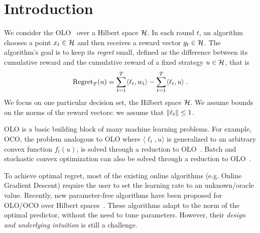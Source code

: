 \section{Introduction}
\label{section:introduction}

We consider the \ac{OLO}~\citep{Cesa-Bianchi-Lugosi-2006, Shalev-Shwartz-2011}
over a Hilbert space $\mathcal{H}$. In each round $t$, an algorithm chooses a point $x_t
\in \mathcal{H}$ and then receives a reward vector $g_t \in \mathcal{H}$. The algorithm's goal is
to keep its \emph{regret} small, defined as the difference between its
cumulative reward and the cumulative reward of a fixed strategy $u \in \mathcal{H}$,
that is
\[
\operatorname{Regret}_T(u) = \sum_{t=1}^T \langle \ell_t, w_t \rangle - \sum_{t=1}^T \langle \ell_t, u \rangle \; .
\]
We focus on one particular decision set, the Hilbert space
$\mathcal{H}$. 
We assume bounds on the norms of the reward vectors: we
assume that $\left\|{\ell_t}\right\| \le 1$.

\ac{OLO} is a basic building block of many machine learning problems. For
example, \ac{OCO}, the problem analogous to \ac{OLO} where $\langle \ell_t, u
\rangle$ is generalized to an arbitrary convex function $f_t(u)$, is solved
through a reduction to \ac{OLO}~\citep{Shalev-Shwartz-2011}.
Batch and stochastic convex optimization
can also be solved through a reduction to \ac{OLO}~\citep{Shalev-Shwartz-2011}.

To achieve optimal regret, most of the existing online algorithms (e.g.  Online
Gradient Descent) require the user to set the learning rate to an
unknown/oracle value. Recently, new parameter-free algorithms have been
proposed for \ac{OLO}/\ac{OCO} over Hilbert
spaces~\citep{Streeter-McMahan-2012, Orabona-2013, McMahan-Abernethy-2013,
McMahan-Orabona-2014, Orabona-2014}.  These algorithms adapt to the norm of the
optimal predictor, without the need to tune parameters. However, their
\emph{design and underlying intuition} is still a challenge.

